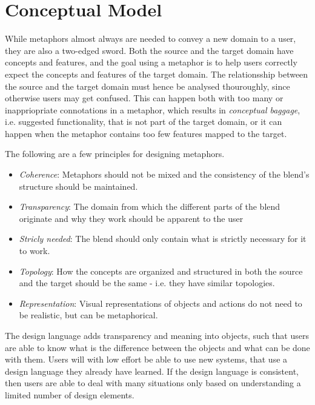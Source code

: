 \section{Conceptual Model} \label{sec:conceptual_model}






While metaphors almost always are needed to convey a new domain to a user, they are also a two-edged sword. Both the source and the target domain have concepts and features, and the goal using a metaphor is to help users correctly expect the concepts and features of the target domain. The relationsship between the source and the target domain must hence be analysed thouroughly, since otherwise users may get confused. This can happen both with too many or inappriopriate connotations in a metaphor, which results in \emph{conceptual baggage}, i.e. suggested functionality, that is not part of the target domain, or it can happen when the metaphor contains too few features mapped to the target. \cite[p. 192, 195-196]{benyon14} \cite[p. 181-182]{anderson} 



The following are a few principles for designing metaphors. \cite[p. 196]{benyon14}
\begin{itemize}
  \item \emph{Coherence}:
    Metaphors should not be mixed and the consistency of the blend's structure should be maintained.
  \item \emph{Transparency}:
    The domain from which the different parts of the blend originate and why they work should be apparent to the user
  \item \emph{Stricly needed}:
    The blend should only contain what is strictly necessary for it to work.
  \item \emph{Topology}:
    How the concepts are organized and structured in both the source and the target should be the same - i.e. they have similar topologies.
  \item \emph{Representation}:
    Visual representations of objects and actions do not need to be realistic, but can be metaphorical.    
\end{itemize}



The design language adds transparency and meaning into objects, such that users are able to know what is the difference between the objects and what can be done with them. Users will with low effort be able to use new systems, that use a design language they already have learned. If the design language is consistent, then users are able to deal with many situations only based on understanding a limited number of design elements.
\cite[p. 204-205]{benyon14}

